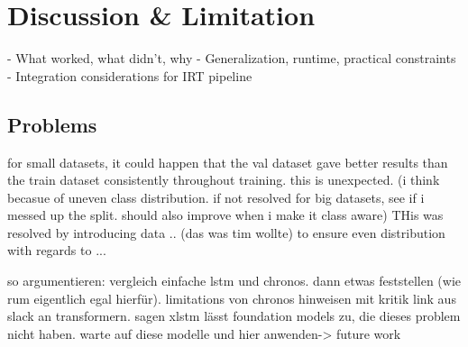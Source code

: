 \chapter{Discussion \& Limitation}%
\label{chap:discussion}
   - What worked, what didn't, why
   - Generalization, runtime, practical constraints
   - Integration considerations for IRT pipeline


   \section{Problems}%
   for small datasets, it could happen that the val dataset gave better results than the train dataset consistently throughout training. this is unexpected. (i think becasue of uneven class distribution. if not resolved for big datasets, see if i messed up the split. should also improve when i make it class aware) THis was resolved by introducing data .. (das was tim wollte) to ensure even distribution with regards to ...



 so argumentieren: vergleich einfache lstm und chronos. dann etwas feststellen (wie rum eigentlich egal hierfür). limitations von chronos hinweisen mit kritik link aus slack an transformern. sagen xlstm lässt foundation models zu, die dieses problem nicht haben. warte auf diese modelle und hier anwenden-> future work